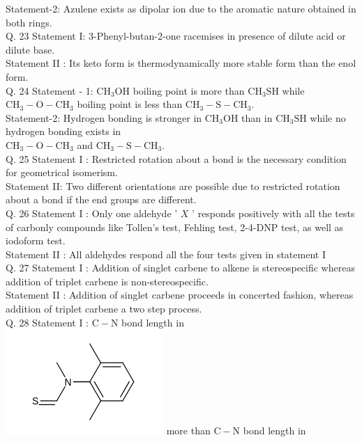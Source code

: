 \documentclass[10pt]{article}
\begin{document}
Statement-2: Azulene exists as dipolar ion due to the aromatic nature obtained in both rings.\\
Q. 23 Statement I: 3-Phenyl-butan-2-one racemises in presence of dilute acid or dilute base.\\
Statement II : Its keto form is thermodynamically more stable form than the enol form.\\
Q. 24 Statement - 1: $\mathrm{CH}_{3} \mathrm{OH}$ boiling point is more than $\mathrm{CH}_{3} \mathrm{SH}$ while $\mathrm{CH}_{3}-\mathrm{O}-\mathrm{CH}_{3}$ boiling point is less than $\mathrm{CH}_{3}-\mathrm{S}-\mathrm{CH}_{3}$.\\
Statement-2: Hydrogen bonding is stronger in $\mathrm{CH}_{3} \mathrm{OH}$ than in $\mathrm{CH}_{3} \mathrm{SH}$ while no hydrogen bonding exists in\\
$\mathrm{CH}_{3}-\mathrm{O}-\mathrm{CH}_{3}$ and $\mathrm{CH}_{3}-\mathrm{S}-\mathrm{CH}_{3}$.\\
Q. 25 Statement I : Restricted rotation about a bond is the necessary condition for geometrical isomerism.\\
Statement II: Two different orientations are possible due to restricted rotation about a bond if the end groups are different.\\
Q. 26 Statement I : Only one aldehyde ' $X$ ' responds positively with all the tests of carbonly compounds like Tollen's test, Fehling test, 2-4-DNP test, as well as iodoform test.\\
Statement II : All aldehydes respond all the four tests given in statement I\\
Q. 27 Statement I : Addition of singlet carbene to alkene is stereospecific whereas addition of triplet carbene is non-stereospecific.\\
Statement II : Addition of singlet carbene proceeds in concerted fashion, whereas addition of triplet carbene a two step process.\\
Q. 28 Statement I : $\mathrm{C}-\mathrm{N}$ bond length in\\
\includegraphics{smile-3627d2e17a33597446357114893e12a2eb74ffe6} more than $\mathrm{C}-\mathrm{N}$ bond length in\\
\end{document}
